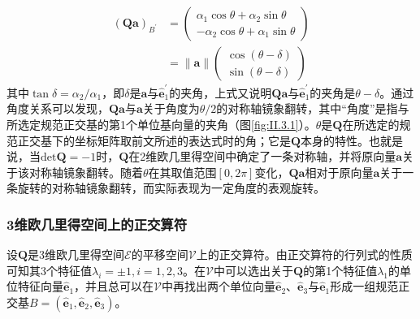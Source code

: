 \documentclass[../main.tex]{subfiles}
\begin{document}
\[
    \begin{aligned}
        \left(\mathbf{Qa}\right)_{B^\prime} & =\left(\begin{array}{c}\alpha_1\cos\theta+\alpha_2\sin\theta\\-\alpha_2\cos\theta+\alpha_1\sin\theta\end{array}\right)           \\
                                            & =\left\|\mathbf{a}\right\|\left(\begin{array}{c}\cos\left(\theta-\delta\right)\\\sin\left(\theta-\delta\right)\end{array}\right)
    \end{aligned}
\]
其中$\tan\delta=\alpha_2/\alpha_1$，即$\delta$是$\mathbf{a}$与$\mathbf{\hat{e}}^\prime_1$的夹角，上式又说明$\mathbf{Qa}$与$\mathbf{\hat{e}}^\prime_1$的夹角是$\theta-\delta$。通过角度关系可以发现，$\mathbf{Qa}$与$\mathbf{a}$关于角度为$\theta/2$的对称轴镜象翻转，其中“角度”是指与所选定规范正交基的第1个单位基向量的夹角（图\ref{fig:II.3.1}）。$\theta$是$\mathbf{Q}$在所选定的规范正交基下的坐标矩阵取前文所述的表达式时的角；它是$\mathbf{Q}$本身的特性。也就是说，当$\mathrm{det}\mathbf{Q}=-1$时，$\mathbf{Q}$在2维欧几里得空间中确定了一条对称轴，并将原向量$\mathbf{a}$关于该对称轴镜象翻转。随着$\theta$在其取值范围$\left[0,2\pi\right]$变化，$\mathbf{Qa}$相对于原向量$\mathbf{a}$关于一条旋转的对称轴镜象翻转，而实际表现为一定角度的表观旋转。

\subsubsection{3维欧几里得空间上的正交算符}
设$\mathbf{Q}$是3维欧几里得空间$\mathcal{E}$的平移空间$\mathcal{V}$上的正交算符。由正交算符的行列式的性质可知其3个特征值$\lambda_i=\pm 1,i=1,2,3$。在$\mathcal{V}$中可以选出关于$\mathbf{Q}$的第1个特征值$\lambda_1$的单位特征向量$\mathbf{\hat{e}}_1$，并且总可以在$\mathcal{V}$中再找出两个单位向量$\mathbf{\hat{e}}_2$、$\mathbf{\hat{e}}_3$与$\mathbf{\hat{e}}_1$形成一组规范正交基$B=\left(\mathbf{\hat{e}}_1,\mathbf{\hat{e}}_2,\mathbf{\hat{e}}_3\right)$。
\end{document}
